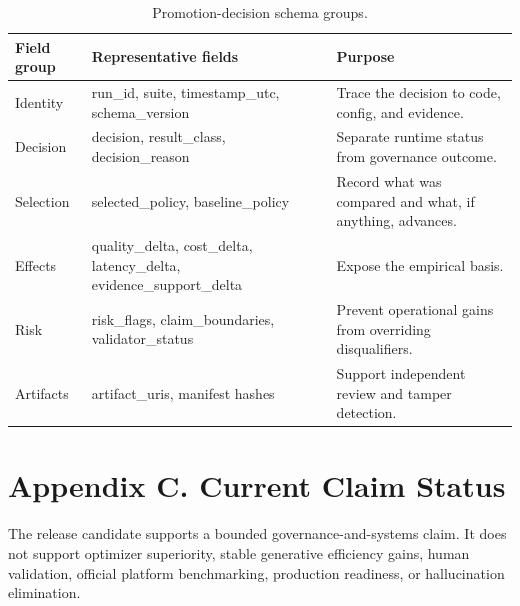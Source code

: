 \documentclass[11pt]{article}
\begin{document}
\begin{table}[t]
\centering
\caption{Promotion-decision schema groups.}
\small
\begin{tabularx}{\linewidth}{>{\raggedright\arraybackslash}X>{\raggedright\arraybackslash}X>{\raggedright\arraybackslash}X}
\toprule
\textbf{Field group} & \textbf{Representative fields} & \textbf{Purpose} \\
\midrule
Identity & run\_id, suite, timestamp\_utc, schema\_version & Trace the decision to code, config, and evidence. \\
Decision & decision, result\_class, decision\_reason & Separate runtime status from governance outcome. \\
Selection & selected\_policy, baseline\_policy & Record what was compared and what, if anything, advances. \\
Effects & quality\_delta, cost\_delta, latency\_delta, evidence\_support\_delta & Expose the empirical basis. \\
Risk & risk\_flags, claim\_boundaries, validator\_status & Prevent operational gains from overriding disqualifiers. \\
Artifacts & artifact\_uris, manifest hashes & Support independent review and tamper detection. \\
\bottomrule
\end{tabularx}
\end{table}

\section{Appendix C. Current Claim Status}
The release candidate supports a bounded governance-and-systems claim. It does not support optimizer superiority, stable generative efficiency gains, human validation, official platform benchmarking, production readiness, or hallucination elimination.
\end{document}
